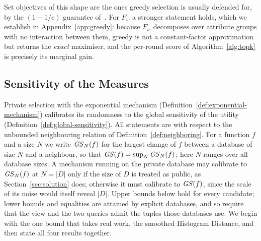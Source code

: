 Set objectives of this shape are the ones greedy selection is usually defended for, by the $(1-1/e)$ guarantee of~\cite{NemhauserWF78}.
For $F_w$ a stronger statement holds, which we establish in Appendix~\ref{app:greedy}: because $F_w$ decomposes over attribute groups with no interaction between them, greedy is not a constant-factor approximation but returns the \emph{exact} maximiser, and the per-round score of Algorithm~\ref{alg:topk} is precisely its marginal gain.

\subsection{Sensitivity of the Measures}
\label{subsec:ideal-sensitivity}

Private selection with the exponential mechanism (Definition~\ref{def:exponential-mechanism}) calibrates its randomness to the global sensitivity of the utility (Definition~\ref{def:global-sensitivity}).
All statements are with respect to the unbounded neighbouring relation of Definition~\ref{def:neighboring}.
For a function $f$ and a size $N$ we write $\mathit{GS}_N(f)$ for the largest change of $f$ between a database of size $N$ and a neighbour, so that $\mathit{GS}(f)=\sup_N\mathit{GS}_N(f)$; here $N$ ranges over all database sizes.
A mechanism running on the private database may calibrate to $\mathit{GS}_N(f)$ at $N=|D|$ only if the size of $D$ is treated as public, as Section~\ref{sec:solution} does; otherwise it must calibrate to $\mathit{GS}(f)$, since the scale of its noise would itself reveal $|D|$.
Upper bounds below hold for every candidate; lower bounds and equalities are attained by explicit databases, and so require that the view and the two queries admit the tuples those databases use.
We begin with the one bound that takes real work, the smoothed Histogram Distance, and then state all four results together.

